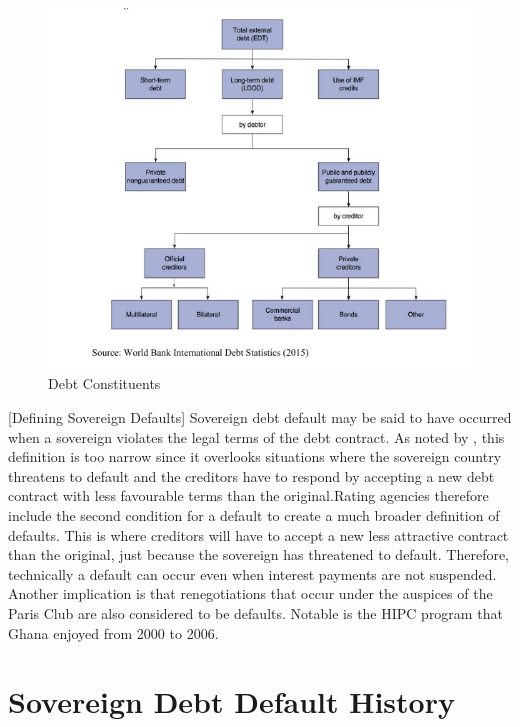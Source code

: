 \documentclass[12pt, a4paper]{article}
\begin{document}
	\begin{figure}[h]
		\centering
		\includegraphics*[width=1\textwidth]{Data/debt_constituents.png}
		\caption[Debt Constituents]{Debt Constituents}
		\label{fig:debtconstituents}
	\end{figure}

	[Defining Sovereign Defaults]
	Sovereign debt default may be said to have occurred when a sovereign violates the legal terms of the debt contract. As noted by , this definition is too narrow since it overlooks situations where the sovereign country threatens to default and the creditors have to respond by accepting a new debt contract with less favourable terms than the original.Rating agencies therefore include the second condition for a default to create a much broader definition of defaults. This is where creditors will have to accept a new less attractive contract than the original, just because the sovereign has threatened to default. Therefore, technically a default can occur even when interest payments are not suspended. Another implication is that renegotiations that occur under the auspices of the Paris Club are also considered to be defaults. Notable is the HIPC program that Ghana enjoyed from 2000 to 2006.\cite{beers2007default} %
	
	\section{Sovereign Debt Default History}
	
\end{document}
